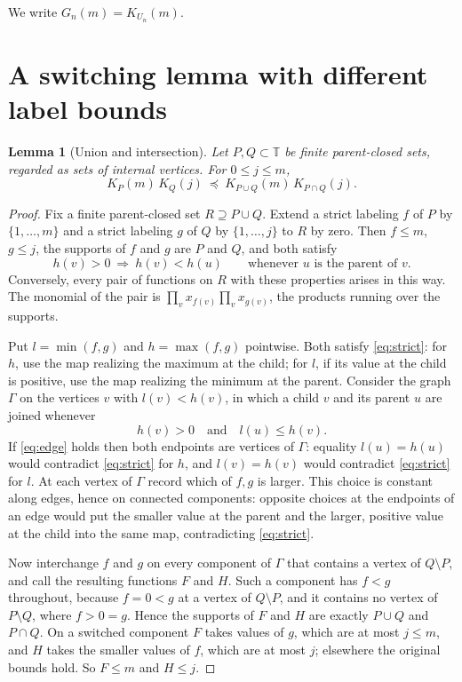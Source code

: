 \documentclass[11pt]{amsart}
\newtheorem{lemma}[theorem]{Lemma}
\theoremstyle{definition}
\theoremstyle{remark}
\newcommand{\pre}{\preceq}
\newcommand{\T}{\mathbb{T}}
\begin{document}
We write $G_n(m)=K_{U_n}(m)$.

\section{A switching lemma with different label bounds}\label{sec:switch}

\begin{lemma}[Union and intersection]\label{lem:switch}
Let $P,Q\subset\T$ be finite parent-closed sets, regarded as sets of internal vertices.
For $0\le j\le m$,
\[
K_P(m)\,K_Q(j)\ \pre\ K_{P\cup Q}(m)\,K_{P\cap Q}(j).
\]
\end{lemma}

\begin{proof}
Fix a finite parent-closed set $R\supseteq P\cup Q$.
Extend a strict labeling $f$ of $P$ by $\{1,\dots,m\}$ and a strict labeling $g$ of $Q$ by $\{1,\dots,j\}$ to $R$ by zero.
Then $f\le m$, $g\le j$, the supports of $f$ and $g$ are $P$ and $Q$, and both satisfy
\begin{equation}\label{eq:strict}
h(v)>0\ \Longrightarrow\ h(v)<h(u)\qquad\text{whenever $u$ is the parent of $v$}.
\end{equation}
Conversely, every pair of functions on $R$ with these properties arises in this way.
The monomial of the pair is $\prod_{v}x_{f(v)}\prod_v x_{g(v)}$, the products running over the supports.

Put $l=\min(f,g)$ and $h=\max(f,g)$ pointwise.
Both satisfy \eqref{eq:strict}: for $h$, use the map realizing the maximum at the child; for $l$, if its value at the child is positive, use the map realizing the minimum at the parent.
Consider the graph $\Gamma$ on the vertices $v$ with $l(v)<h(v)$, in which a child $v$ and its parent $u$ are joined whenever
\begin{equation}\label{eq:edge}
h(v)>0\quad\text{and}\quad l(u)\le h(v).
\end{equation}
If \eqref{eq:edge} holds then both endpoints are vertices of $\Gamma$: equality $l(u)=h(u)$ would contradict \eqref{eq:strict} for $h$, and $l(v)=h(v)$ would contradict \eqref{eq:strict} for $l$.
At each vertex of $\Gamma$ record which of $f,g$ is larger.
This choice is constant along edges, hence on connected components: opposite choices at the endpoints of an edge would put the smaller value at the parent and the larger, positive value at the child into the same map, contradicting \eqref{eq:strict}.

Now interchange $f$ and $g$ on every component of $\Gamma$ that contains a vertex of $Q\setminus P$, and call the resulting functions $F$ and $H$.
Such a component has $f<g$ throughout, because $f=0<g$ at a vertex of $Q\setminus P$, and it contains no vertex of $P\setminus Q$, where $f>0=g$.
Hence the supports of $F$ and $H$ are exactly $P\cup Q$ and $P\cap Q$.
On a switched component $F$ takes values of $g$, which are at most $j\le m$, and $H$ takes the smaller values of $f$, which are at most $j$; elsewhere the original bounds hold.
So $F\le m$ and $H\le j$.


\end{proof}
\end{document}
